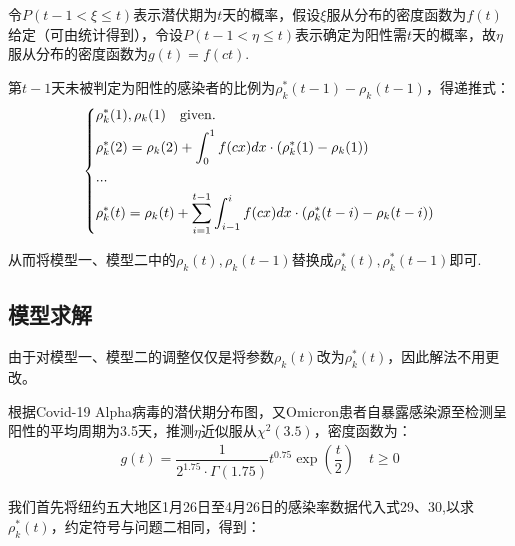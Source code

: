 \documentclass[withoutpreface,bwprint]{cumcmthesis} %
\begin{document}
令$P(t-1<\xi \leqslant t)$表示潜伏期为$t$天的概率，假设$\xi$服从分布的密度函数为$f(t)$给定（可由统计得到），令设$P(t-1< \eta \leqslant t)$表示确定为阳性需$t$天的概率，故$\eta$服从分布的密度函数为$g(t)=f(ct)$.

第$t-1$天未被判定为阳性的感染者的比例为$\rho^*_k(t-1)-\rho_k(t-1)$，得递推式：
\begin{align}
\left\{
\begin{aligned}
    & \rho^*_k(1),\rho_k(1)\quad {\rm given.}\\
    & \rho^*_k(2) =\rho_k(2) +\int^1_0 f(cx)dx\cdot \left(\rho^*_k(1)-\rho_k(1) \right)   \\
    & ...  \\
    & \rho^*_k(t) =\rho_k(t) + \sum^{t-1}_{i=1} \int^i_{i-1} f(cx)dx \cdot \left(\rho^*_k(t-i)-\rho_k(t-i) \right) 
\end{aligned}
 \right.  
\end{align}

从而将模型一、模型二中的$\rho_k(t),\rho_k(t-1)$替换成$\rho^*_k(t),\rho^*_k(t-1)$即可.

\subsection{模型求解}
由于对模型一、模型二的调整仅仅是将参数$\rho_k(t)$改为$\rho^*_k(t)$，因此解法不用更改。

根据Covid-19 Alpha病毒的潜伏期分布图\cite{wuhan}，又Omicron患者自暴露感染源至检测呈阳性的平均周期为3.5天，推测$\eta$近似服从$ \chi^2  \left(3.5\right)$，密度函数为：
\begin{align}
    g(t)= \dfrac{1}{2^1.75 \cdot \Gamma \left(1.75 \right)}t^{0.75}\exp \left(\dfrac{t}{2} \right) \quad t\geqslant0 
\end{align}

我们首先将纽约五大地区1月26日至4月26日的感染率数据代入式29、30,以求$\rho^*_k(t)$，约定符号与问题二相同，得到：
\end{document}
